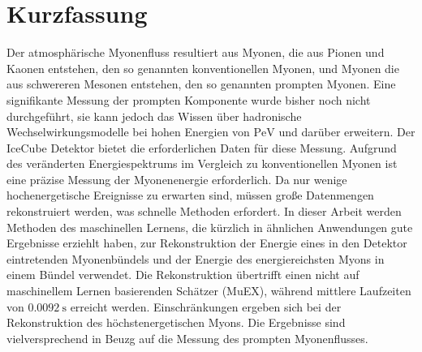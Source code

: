 \documentclass[
  tucolor,       %
  BCOR=12mm,     %
  parskip=half,  %
  open=any,      %
  cleardoublepage=plain,  %
]{tudothesis}
\begin{document}
\section*{Kurzfassung}
Der atmosphärische Myonenfluss resultiert aus Myonen, die aus Pionen und Kaonen entstehen, den so genannten konventionellen Myonen, und Myonen die aus schwereren Mesonen entstehen, den so genannten prompten Myonen.
Eine signifikante Messung der prompten Komponente wurde bisher noch nicht durchgeführt, sie kann jedoch das Wissen über hadronische Wechselwirkungsmodelle bei hohen Energien von $\si{\peta\electronvolt}$ und darüber erweitern.
Der IceCube Detektor bietet die erforderlichen Daten für diese Messung.
Aufgrund des veränderten Energiespektrums im Vergleich zu konventionellen Myonen ist eine präzise Messung der Myonenenergie erforderlich. Da nur wenige hochenergetische Ereignisse zu erwarten sind, müssen große Datenmengen rekonstruiert werden, was schnelle Methoden erfordert.
In dieser Arbeit werden Methoden des maschinellen Lernens, die kürzlich in ähnlichen Anwendungen gute Ergebnisse erziehlt haben, zur Rekonstruktion der Energie eines in den Detektor eintretenden Myonenbündels und der Energie des energiereichsten Myons in einem Bündel verwendet.
Die Rekonstruktion übertrifft einen nicht auf maschinellem Lernen basierenden Schätzer (MuEX), während mittlere Laufzeiten von $\SI{0.0092}{\second}$ erreicht werden.
Einschränkungen ergeben sich bei der Rekonstruktion des höchstenergetischen Myons.
Die Ergebnisse sind vielversprechend in Beuzg auf die Messung des prompten Myonenflusses.
\tableofcontents
\end{document}
